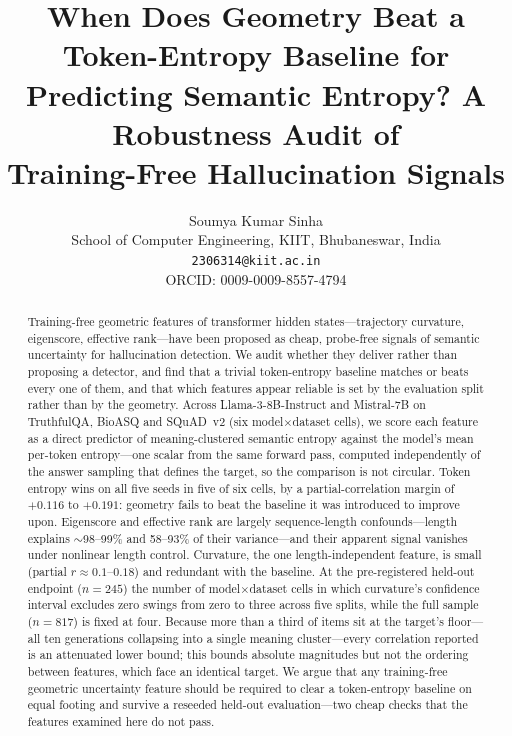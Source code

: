 \documentclass[11pt]{article}
\title{When Does Geometry Beat a Token-Entropy Baseline for\\ Predicting Semantic Entropy? A Robustness Audit of\\ Training-Free Hallucination Signals}
\author{Soumya Kumar Sinha \\
  School of Computer Engineering, KIIT, Bhubaneswar, India \\
  \texttt{2306314@kiit.ac.in} \\
  ORCID: 0009-0009-8557-4794}
\begin{document}
\maketitle
\begin{abstract}
\noindent Training-free geometric features of transformer hidden states---trajectory curvature, eigenscore, effective rank---have been proposed as cheap, probe-free signals of semantic uncertainty for hallucination detection. We audit whether they deliver rather than proposing a detector, and find that a trivial token-entropy baseline matches or beats every one of them, and that which features appear reliable is set by the evaluation split rather than by the geometry. Across Llama-3-8B-Instruct and Mistral-7B on TruthfulQA, BioASQ and SQuAD~v2 (six model$\times$dataset cells), we score each feature as a direct predictor of meaning-clustered semantic entropy against the model's mean per-token entropy---one scalar from the same forward pass, computed independently of the answer sampling that defines the target, so the comparison is not circular. Token entropy wins on all five seeds in five of six cells, by a partial-correlation margin of $+0.116$ to $+0.191$: geometry fails to beat the baseline it was introduced to improve upon. Eigenscore and effective rank are largely sequence-length confounds---length explains $\sim$98--99\% and 58--93\% of their variance---and their apparent signal vanishes under nonlinear length control. Curvature, the one length-independent feature, is small (partial $r \approx 0.1$--$0.18$) and redundant with the baseline. At the pre-registered held-out endpoint ($n=245$) the number of model$\times$dataset cells in which curvature's confidence interval excludes zero swings from zero to three across five splits, while the full sample ($n=817$) is fixed at four. Because more than a third of items sit at the target's floor---all ten generations collapsing into a single meaning cluster---every correlation reported is an attenuated lower bound; this bounds absolute magnitudes but not the ordering between features, which face an identical target. We argue that any training-free geometric uncertainty feature should be required to clear a token-entropy baseline on equal footing and survive a reseeded held-out evaluation---two cheap checks that the features examined here do not pass.
\end{abstract}
\end{document}
